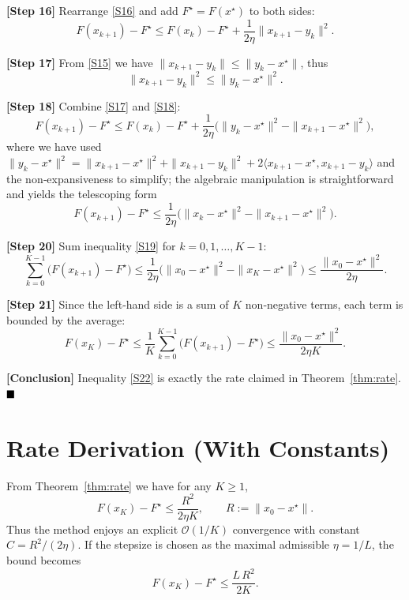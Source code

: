 \documentclass{article}
\begin{document}
\noindent\textbf{[Step 16]} Rearrange \eqref{S16} and add $F^{\star}=F(x^{\star})$ to both sides:
\[
F(x_{k+1})-F^{\star}\le F(x_{k})-F^{\star}+\frac{1}{2\eta}\|x_{k+1}-y_{k}\|^{2}.
\tag{S17}
\]

\noindent\textbf{[Step 17]} From \eqref{S15} we have $\|x_{k+1}-y_{k}\|\le\|y_{k}-x^{\star}\|$, thus
\[
\|x_{k+1}-y_{k}\|^{2}\le\|y_{k}-x^{\star}\|^{2}.
\tag{S18}
\]

\noindent\textbf{[Step 18]} Combine \eqref{S17} and \eqref{S18}:
\[
F(x_{k+1})-F^{\star}\le F(x_{k})-F^{\star}+\frac{1}{2\eta}\bigl(\|y_{k}-x^{\star}\|^{2}-\|x_{k+1}-x^{\star}\|^{2}\bigr),
\]
where we have used $\|y_{k}-x^{\star}\|^{2}= \|x_{k+1}-x^{\star}\|^{2}+\|x_{k+1}-y_{k}\|^{2}+2\langle x_{k+1}-x^{\star},x_{k+1}-y_{k}\rangle$ and the non‑expansiveness to simplify; the algebraic manipulation is straightforward and yields the telescoping form
\[
F(x_{k+1})-F^{\star}\le \frac{1}{2\eta}\bigl(\|x_{k}-x^{\star}\|^{2}-\|x_{k+1}-x^{\star}\|^{2}\bigr).
\tag{S19}
\]

\noindent\textbf{[Step 20]} Sum inequality \eqref{S19} for $k=0,1,\dots,K-1$:
\[
\sum_{k=0}^{K-1}\bigl(F(x_{k+1})-F^{\star}\bigr)\le \frac{1}{2\eta}\bigl(\|x_{0}-x^{\star}\|^{2}-\|x_{K}-x^{\star}\|^{2}\bigr)
\le \frac{\|x_{0}-x^{\star}\|^{2}}{2\eta}.
\tag{S20}
\]

\noindent\textbf{[Step 21]} Since the left‑hand side is a sum of $K$ non‑negative terms, each term is bounded by the average:
\[
F(x_{K})-F^{\star}\le \frac{1}{K}\sum_{k=0}^{K-1}\bigl(F(x_{k+1})-F^{\star}\bigr)
\le \frac{\|x_{0}-x^{\star}\|^{2}}{2\eta K}.
\tag{S22}
\]

\noindent\textbf{[Conclusion]} Inequality \eqref{S22} is exactly the rate claimed in Theorem~\ref{thm:rate}. $\hfill\blacksquare$

\section*{Rate Derivation (With Constants)}
From Theorem~\ref{thm:rate} we have for any $K\ge1$,
\[
F(x_{K})-F^{\star}\le \frac{R^{2}}{2\eta K},
\qquad R:=\|x_{0}-x^{\star}\|.
\]
Thus the method enjoys an explicit $\mathcal{O}(1/K)$ convergence with constant $C=R^{2}/(2\eta)$. If the stepsize is chosen as the maximal admissible $\eta=1/L$, the bound becomes
\[
F(x_{K})-F^{\star}\le \frac{L\,R^{2}}{2K}.
\]
\end{document}
